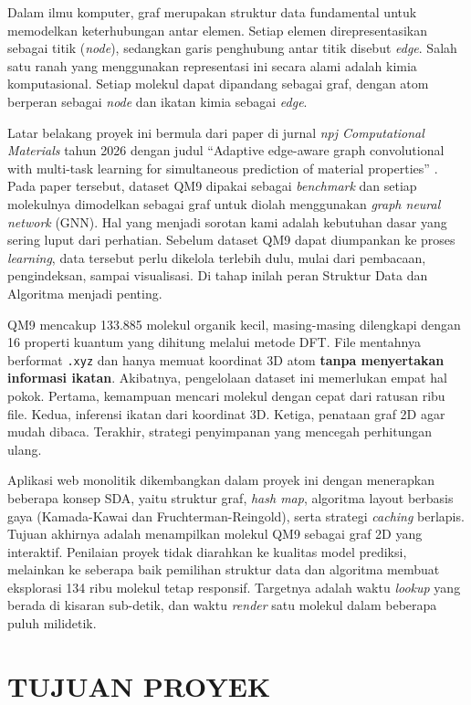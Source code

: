\documentclass[a4paper,12pt]{report}
\begin{document}
Dalam ilmu komputer, graf merupakan struktur data fundamental untuk memodelkan keterhubungan antar elemen. Setiap elemen direpresentasikan sebagai titik (\textit{node}), sedangkan garis penghubung antar titik disebut \textit{edge}. Salah satu ranah yang menggunakan representasi ini secara alami adalah kimia komputasional. Setiap molekul dapat dipandang sebagai graf, dengan atom berperan sebagai \textit{node} dan ikatan kimia sebagai \textit{edge}.

Latar belakang proyek ini bermula dari paper di jurnal \textit{npj Computational Materials} tahun 2026 dengan judul ``Adaptive edge-aware graph convolutional with multi-task learning for simultaneous prediction of material properties'' \cite{lu2026aegcnn}. Pada paper tersebut, dataset QM9 dipakai sebagai \textit{benchmark} dan setiap molekulnya dimodelkan sebagai graf untuk diolah menggunakan \textit{graph neural network} (GNN). Hal yang menjadi sorotan kami adalah kebutuhan dasar yang sering luput dari perhatian. Sebelum dataset QM9 dapat diumpankan ke proses \textit{learning}, data tersebut perlu dikelola terlebih dulu, mulai dari pembacaan, pengindeksan, sampai visualisasi. Di tahap inilah peran Struktur Data dan Algoritma menjadi penting.

QM9 mencakup 133.885 molekul organik kecil, masing-masing dilengkapi dengan 16 properti kuantum yang dihitung melalui metode DFT. File mentahnya berformat \texttt{.xyz} dan hanya memuat koordinat 3D atom \textbf{tanpa menyertakan informasi ikatan}. Akibatnya, pengelolaan dataset ini memerlukan empat hal pokok. Pertama, kemampuan mencari molekul dengan cepat dari ratusan ribu file. Kedua, inferensi ikatan dari koordinat 3D. Ketiga, penataan graf 2D agar mudah dibaca. Terakhir, strategi penyimpanan yang mencegah perhitungan ulang.

Aplikasi web monolitik dikembangkan dalam proyek ini dengan menerapkan beberapa konsep SDA, yaitu struktur graf, \textit{hash map}, algoritma layout berbasis gaya (Kamada-Kawai dan Fruchterman-Reingold), serta strategi \textit{caching} berlapis. Tujuan akhirnya adalah menampilkan molekul QM9 sebagai graf 2D yang interaktif. Penilaian proyek tidak diarahkan ke kualitas model prediksi, melainkan ke seberapa baik pemilihan struktur data dan algoritma membuat eksplorasi 134 ribu molekul tetap responsif. Targetnya adalah waktu \textit{lookup} yang berada di kisaran sub-detik, dan waktu \textit{render} satu molekul dalam beberapa puluh milidetik.

\chapter{TUJUAN PROYEK}
\end{document}

